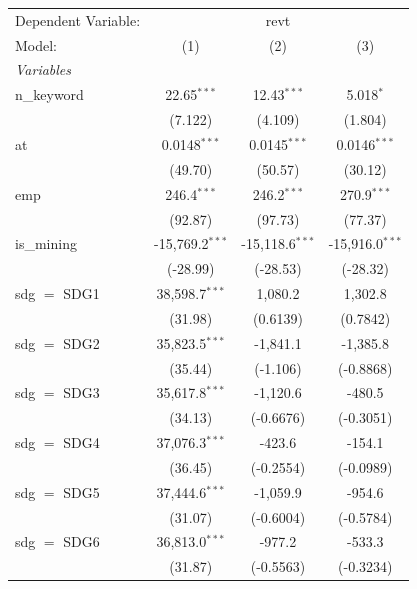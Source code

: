
\begingroup
\centering
\begin{tabular}{lccc}
   \tabularnewline \midrule \midrule
   Dependent Variable: & \multicolumn{3}{c}{revt}\\
   Model:        & (1)               & (2)               & (3)\\  
   \midrule
   \emph{Variables}\\
   n\_keyword    & 22.65$^{***}$     & 12.43$^{***}$     & 5.018$^{*}$\\   
                 & (7.122)           & (4.109)           & (1.804)\\   
   at            & 0.0148$^{***}$    & 0.0145$^{***}$    & 0.0146$^{***}$\\   
                 & (49.70)           & (50.57)           & (30.12)\\   
   emp           & 246.4$^{***}$     & 246.2$^{***}$     & 270.9$^{***}$\\   
                 & (92.87)           & (97.73)           & (77.37)\\   
   is\_mining    & -15,769.2$^{***}$ & -15,118.6$^{***}$ & -15,916.0$^{***}$\\   
                 & (-28.99)          & (-28.53)          & (-28.32)\\   
   sdg $=$ SDG1  & 38,598.7$^{***}$  & 1,080.2           & 1,302.8\\   
                 & (31.98)           & (0.6139)          & (0.7842)\\   
   sdg $=$ SDG2  & 35,823.5$^{***}$  & -1,841.1          & -1,385.8\\   
                 & (35.44)           & (-1.106)          & (-0.8868)\\   
   sdg $=$ SDG3  & 35,617.8$^{***}$  & -1,120.6          & -480.5\\   
                 & (34.13)           & (-0.6676)         & (-0.3051)\\   
   sdg $=$ SDG4  & 37,076.3$^{***}$  & -423.6            & -154.1\\   
                 & (36.45)           & (-0.2554)         & (-0.0989)\\   
   sdg $=$ SDG5  & 37,444.6$^{***}$  & -1,059.9          & -954.6\\   
                 & (31.07)           & (-0.6004)         & (-0.5784)\\   
   sdg $=$ SDG6  & 36,813.0$^{***}$  & -977.2            & -533.3\\   
                 & (31.87)           & (-0.5563)         & (-0.3234)\\   

\end{tabular}
